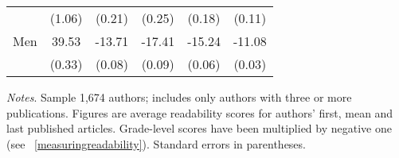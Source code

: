 \begin{table}[H]
\begin{threeparttable}
\begin{tabular}{p{3cm}S@{}S@{}S@{}S@{}S@{}}
                                          &      (1.06)&      (0.21)&      (0.25)&      (0.18)&      (0.11)\\
            \quad Men                     &       39.53&      -13.71&      -17.41&      -15.24&      -11.08\\
                                          &      (0.33)&      (0.08)&      (0.09)&      (0.06)&      (0.03)\\
            \bottomrule
        \end{tabular}
        \begin{tablenotes}
            \tiny
            \item \textit{Notes}. Sample 1,674 authors; includes only authors with three or more publications. Figures are average readability scores for authors' first, mean and last published articles. Grade-level scores have been multiplied by negative one (see ~\autoref{measuringreadability}). Standard errors in parentheses.
        \end{tablenotes}
    \end{threeparttable}
\end{table}